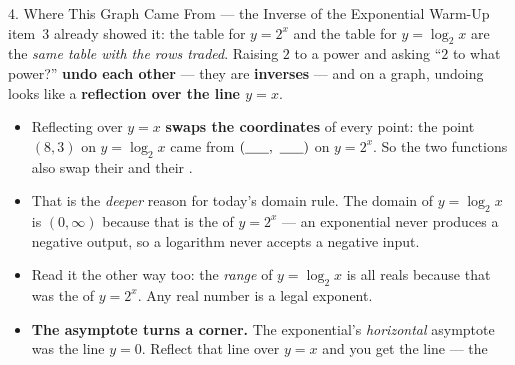 \documentclass[10pt]{article}
\newcommand{\lgrid}[4]{%
  \draw[step=1, linegray!40, very thin] (#1,#3) grid (#2,#4);
  \draw[->, semithick, charcoal] (#1,0)--(#2,0) node[below right, font=\scriptsize]{$x$};
  \draw[->, semithick, charcoal] (0,#3)--(0,#4) node[left, font=\scriptsize]{$y$};}
\newcommand{\logcurve}[5]{\draw[very thick, forest, domain=#4:#5, samples=120, smooth]
  plot ({pow(#1,\x-(#3))+(#2)},{\x});}
\begin{document}
\begin{notesbox}{4. Where This Graph Came From --- the Inverse of the Exponential}
Warm-Up item~3 already showed it: the table for $y=2^x$ and the table for $y=\log_2 x$ are the
\emph{same table with the rows traded}. Raising $2$ to a power and asking ``$2$ to what power?''
\textbf{undo each other} --- they are \textbf{inverses} --- and on a graph, undoing looks like a
\textbf{reflection over the line $y=x$}.
\begin{center}
\end{center}
\begin{itemize}[leftmargin=1.5em, itemsep=3pt]
  \item Reflecting over $y=x$ \textbf{swaps the coordinates} of every point: the point $(8,3)$ on
        $y=\log_2 x$ came from $(\blank{0.6cm},\ \blank{0.6cm})$ on $y=2^x$. So the two functions
        also swap their \blank{2.0cm} and their \blank{2.0cm}.
  \item That is the \emph{deeper} reason for today's domain rule. The domain of $y=\log_2 x$ is
        $(0,\infty)$ because that is the \blank{2.0cm} of $y=2^x$ --- an exponential never produces a
        negative output, so a logarithm never accepts a negative input.
  \item Read it the other way too: the \emph{range} of $y=\log_2 x$ is all reals because that was the
        \blank{2.0cm} of $y=2^x$. Any real number is a legal exponent.
  \item \textbf{The asymptote turns a corner.} The exponential's \emph{horizontal} asymptote was the
        line $y=0$. Reflect that line over $y=x$ and you get the line \blank{1.6cm} --- the

\end{itemize}
\end{notesbox}
\end{document}
